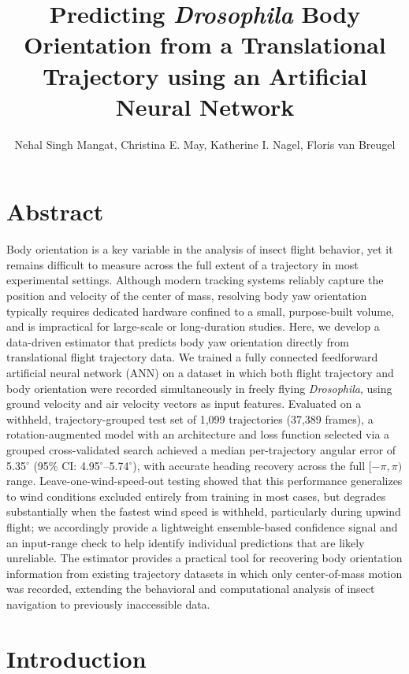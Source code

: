 \documentclass[11pt]{article}
\title{Predicting \textit{Drosophila} Body Orientation from a Translational Trajectory using an Artificial Neural Network }
\author{Nehal Singh Mangat, Christina E. May, Katherine I. Nagel, Floris van Breugel}
\begin{document}
\maketitle

\section*{Abstract}

Body orientation is a key variable in the analysis of insect flight behavior, yet it remains difficult to measure across the full extent of a trajectory in most experimental settings. Although modern tracking systems reliably capture the position and velocity of the center of mass, resolving body yaw orientation typically requires dedicated hardware confined to a small, purpose-built volume, and is impractical for large-scale or long-duration studies. Here, we develop a data-driven estimator that predicts body yaw orientation directly from translational flight trajectory data. We trained a fully connected feedforward artificial neural network (ANN) on a dataset in which both flight trajectory and body orientation were recorded simultaneously in freely flying \textit{Drosophila}, using ground velocity and air velocity vectors as input features.
Evaluated on a withheld, trajectory-grouped test set of 1,099 trajectories (37,389 frames), a rotation-augmented model with an architecture and loss function selected via a grouped cross-validated search achieved a median per-trajectory angular error of 5.35$^{\circ}$ (95\% CI: 4.95$^{\circ}$--5.74$^{\circ}$), with accurate heading recovery across the full $[-\pi,\pi)$ range. Leave-one-wind-speed-out testing showed that this performance generalizes to wind conditions excluded entirely from training in most cases, but degrades substantially when the fastest wind speed is withheld, particularly during upwind flight; we accordingly provide a lightweight ensemble-based confidence signal and an input-range check to help identify individual predictions that are likely unreliable. The estimator provides a practical tool for recovering body orientation information from existing trajectory datasets in which only center-of-mass motion was recorded, extending the behavioral and computational analysis of insect navigation to previously inaccessible data.

\section*{Introduction}
\end{document}
